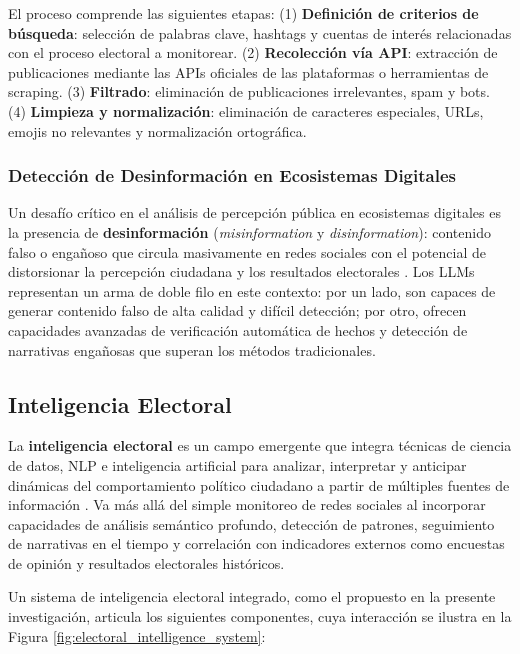 \documentclass[listof=nochaptergap,12pt,times,authoryear]{report}
\begin{document}
El proceso comprende las siguientes etapas: (1) \textbf{Definición de criterios de búsqueda}: selección de palabras clave, hashtags y cuentas de interés relacionadas con el proceso electoral a monitorear. (2) \textbf{Recolección vía API}: extracción de publicaciones mediante las APIs oficiales de las plataformas o herramientas de scraping. (3) \textbf{Filtrado}: eliminación de publicaciones irrelevantes, spam y bots. (4) \textbf{Limpieza y normalización}: eliminación de caracteres especiales, URLs, emojis no relevantes y normalización ortográfica.
 
\subsubsection{Detección de Desinformación en Ecosistemas Digitales}
 
Un desafío crítico en el análisis de percepción pública en ecosistemas digitales es la presencia de \textbf{desinformación} (\textit{misinformation} y \textit{disinformation}): contenido falso o engañoso que circula masivamente en redes sociales con el potencial de distorsionar la percepción ciudadana y los resultados electorales \parencite{pr_chen2024combating_misinformation}. Los LLMs representan un arma de doble filo en este contexto: por un lado, son capaces de generar contenido falso de alta calidad y difícil detección; por otro, ofrecen capacidades avanzadas de verificación automática de hechos y detección de narrativas engañosas que superan los métodos tradicionales.
 
\subsection{Inteligencia Electoral}
 
La \textbf{inteligencia electoral} es un campo emergente que integra técnicas de ciencia de datos, NLP e inteligencia artificial para analizar, interpretar y anticipar dinámicas del comportamiento político ciudadano a partir de múltiples fuentes de información \parencite{tec_ceron2017social}. Va más allá del simple monitoreo de redes sociales al incorporar capacidades de análisis semántico profundo, detección de patrones, seguimiento de narrativas en el tiempo y correlación con indicadores externos como encuestas de opinión y resultados electorales históricos.
 
Un sistema de inteligencia electoral integrado, como el propuesto en la presente investigación, articula los siguientes componentes, cuya interacción se ilustra en la Figura \ref{fig:electoral_intelligence_system}:
 
\end{document}
